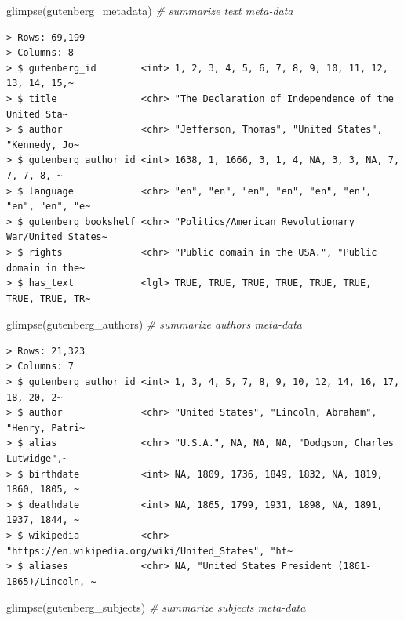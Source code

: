 \documentclass[
  letterpaper,
]{latex/krantz}
\newenvironment{Shaded}{\begin{snugshade}}{\end{snugshade}}
\newcommand{\CommentTok}[1]{\textcolor[rgb]{0.00,0.00,0.00}{\textit{#1}}}
\newcommand{\FunctionTok}[1]{\textcolor[rgb]{0.00,0.00,0.00}{#1}}
\newcommand{\NormalTok}[1]{\textcolor[rgb]{0.00,0.00,0.00}{#1}}
\begin{document}
\begin{Shaded}
\begin{Highlighting}[]
\FunctionTok{glimpse}\NormalTok{(gutenberg\_metadata) }\CommentTok{\# summarize text meta{-}data}
\end{Highlighting}
\end{Shaded}

\begin{verbatim}
> Rows: 69,199
> Columns: 8
> $ gutenberg_id        <int> 1, 2, 3, 4, 5, 6, 7, 8, 9, 10, 11, 12, 13, 14, 15,~
> $ title               <chr> "The Declaration of Independence of the United Sta~
> $ author              <chr> "Jefferson, Thomas", "United States", "Kennedy, Jo~
> $ gutenberg_author_id <int> 1638, 1, 1666, 3, 1, 4, NA, 3, 3, NA, 7, 7, 7, 8, ~
> $ language            <chr> "en", "en", "en", "en", "en", "en", "en", "en", "e~
> $ gutenberg_bookshelf <chr> "Politics/American Revolutionary War/United States~
> $ rights              <chr> "Public domain in the USA.", "Public domain in the~
> $ has_text            <lgl> TRUE, TRUE, TRUE, TRUE, TRUE, TRUE, TRUE, TRUE, TR~
\end{verbatim}

\begin{Shaded}
\begin{Highlighting}[]
\FunctionTok{glimpse}\NormalTok{(gutenberg\_authors) }\CommentTok{\# summarize authors meta{-}data}
\end{Highlighting}
\end{Shaded}

\begin{verbatim}
> Rows: 21,323
> Columns: 7
> $ gutenberg_author_id <int> 1, 3, 4, 5, 7, 8, 9, 10, 12, 14, 16, 17, 18, 20, 2~
> $ author              <chr> "United States", "Lincoln, Abraham", "Henry, Patri~
> $ alias               <chr> "U.S.A.", NA, NA, NA, "Dodgson, Charles Lutwidge",~
> $ birthdate           <int> NA, 1809, 1736, 1849, 1832, NA, 1819, 1860, 1805, ~
> $ deathdate           <int> NA, 1865, 1799, 1931, 1898, NA, 1891, 1937, 1844, ~
> $ wikipedia           <chr> "https://en.wikipedia.org/wiki/United_States", "ht~
> $ aliases             <chr> NA, "United States President (1861-1865)/Lincoln, ~
\end{verbatim}

\begin{Shaded}
\begin{Highlighting}[]
\FunctionTok{glimpse}\NormalTok{(gutenberg\_subjects) }\CommentTok{\# summarize subjects meta{-}data}
\end{Highlighting}
\end{Shaded}
\end{document}
